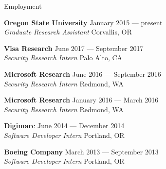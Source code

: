 \documentclass{resume} %
\begin{document}
\begin{rSection}{Employment}

{\bf Oregon State University} \hfill {January 2015 --- present}\\
{\emph{Graduate Research Assistant} \hfill {Corvallis, OR}}

{\bf Visa Research} \hfill {June 2017 --- September 2017}\\
{\emph{Security Research Intern} \hfill {Palo Alto, CA}}

{\bf Microsoft Research} \hfill {June 2016 --- September 2016}\\
{\emph{Security Research Intern} \hfill {Redmond, WA}}

{\bf Microsoft Research} \hfill {January 2016 --- March 2016}\\
{\emph{Security Research Intern} \hfill {Redmond, WA}}

{\bf Digimarc} \hfill {June 2014 --- December 2014}\\
{\emph{Software Developer Intern} \hfill {Portland, OR}}

{\bf Boeing Company} \hfill {March 2013 --- September 2013}\\
{\emph{Software Developer Intern} \hfill {Portland, OR}}



\end{rSection}

\end{document}
